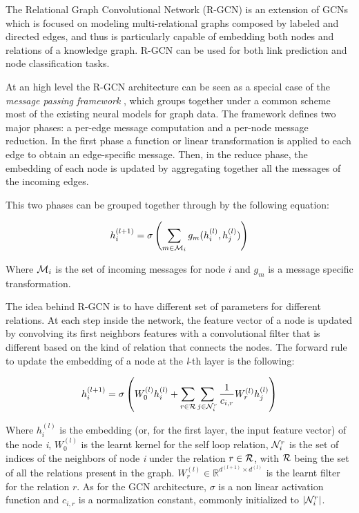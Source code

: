 \documentclass[%
    corpo=13.5pt,
    twoside,
    oldstyle,
    tipotesi=magistrale,
    greek,
    evenboxes
]{toptesi}
\begin{document}
The Relational Graph Convolutional Network \cite{schlichtkrull2018} (R-GCN) is an
extension of GCNs which is focused on modeling multi-relational graphs composed
by labeled and directed edges, and thus is particularly capable of embedding
both nodes and relations of a knowledge graph.
R-GCN can be used for both link prediction and node classification tasks.

At an high level the R-GCN architecture can be seen as a special case of
the \emph{message passing framework} \cite{gilmer2017}, which groups together
under a common scheme most of the existing neural models for graph data.
The framework defines two major phases: a per-edge message computation and a
per-node message reduction.
In the first phase a function or linear transformation is applied to each edge
to obtain an edge-specific message.
Then, in the reduce phase, the embedding of each node is updated by aggregating
together all the messages of the incoming edges.

This two phases can be grouped together through by the following equation:

\begin{equation}
    h_i^{(l+1)} = \sigma \left(
            \sum_{m\in{\CMcal{M}_i}} g_m(h_i^{(l)}, h_j^{(l)})
        \right)
\end{equation}

Where $\CMcal{M}_i$ is the set of incoming messages for node $i$ and
$g_m$ is a message specific transformation.
\newline

The idea behind R-GCN is to have different set of parameters
for different relations.
At each step inside the network, the feature vector of a node is updated by
convolving its first neighbors features with a convolutional filter that is
different based on the kind of relation that connects the nodes.
The forward
rule to update the embedding of a node at the \emph{l}-th layer is the following:

\begin{equation}
    h^{(l+1)}_{i} = \sigma \left(
        W_0^{(l)}h_i^{(l)} + \sum_{r\in\CMcal{R}}\sum_{j\in\CMcal{N}_i^r}
        \frac{1}{c_{i,r}} W_r^{(l)} h_j^{(l)}
    \right)
\end{equation}

Where $h_i^{(l)}$ is the embedding (or, for the first layer, the input feature
vector) of the node \emph{i}, $W_0^{(l)}$ is the learnt kernel for the
self loop relation, $\CMcal{N}_i^r$ is the
set of indices of the neighbors of node \emph{i} under the relation
$r\in\CMcal{R}$, with $\CMcal{R}$ being the set of all the relations present in
the graph. $W_r^{(l)}\in\mathbb{R}^{d^{(l+1)}\times d^{(l)}}$ is the learnt
filter for the relation $r$. As for the GCN architecture, $\sigma$ is a non
linear activation function and $c_{i,r}$ is a normalization constant, commonly
initialized to $|\CMcal{N}_i^r|$.
\end{document}
